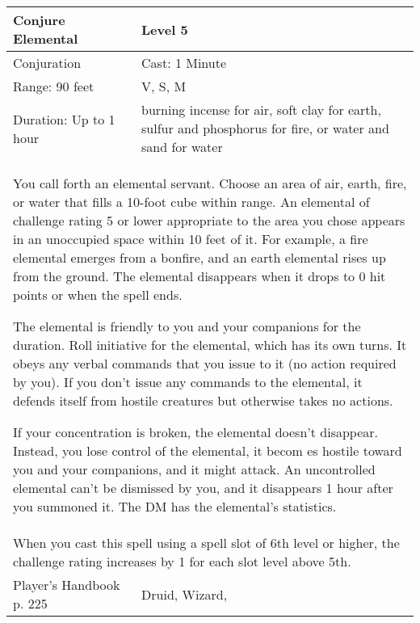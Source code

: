 \documentclass[11pt]{report}
\begin{document}
\begin{table}[H]
	\begin{tabular}{||p{6cm}|p{6cm}||}
		\hline\hline
		\bf{Conjure Elemental} & Level 5\\ \hline
		Conjuration & Cast: 1 Minute\\ \hline
		Range: 90 feet & V, S, M \\ \hline
		Duration: Up to 1 hour & burning incense for air, soft clay for earth, sulfur and phosphorus for fire, or water and sand for water\\ \hline
		\multicolumn{2}{||p{12cm}||}{You call forth an elemental servant. 
Choose an area of air, earth, fire, or water that fills a 10-foot cube within range. An elemental of challenge rating 5 or lower appropriate to the area you chose appears in an unoccupied space within 10 feet of it. For example, a fire elemental emerges from a bonfire, and an earth elemental rises up from the ground. The elemental disappears when it drops to 0 hit points or when the spell ends. 

The elemental is friendly to you and your companions for the duration. Roll initiative for the elemental, which has its own turns. It obeys any verbal commands that you issue to it (no action required by you). If you don’t issue any commands to the elemental, it defends itself from hostile creatures but otherwise takes no actions. 

If your concentration is broken, the elemental doesn’t disappear. Instead, you lose control of the elemental, it becom es hostile toward you and your companions, and it might attack. An uncontrolled elemental can’t be dismissed by you, and it disappears 1 hour after you summoned it. The DM has the elemental’s statistics.}\\ \hline
		\multicolumn{2}{||p{12cm}||}{When you cast this spell using a spell slot of 6th level or higher, the challenge rating increases by 1 for each slot level above 5th.}\\ \hline
Player's Handbook p. 225 & Druid, Wizard, \\ \hline\hline
	\end{tabular}
\end{table}
\end{document}
